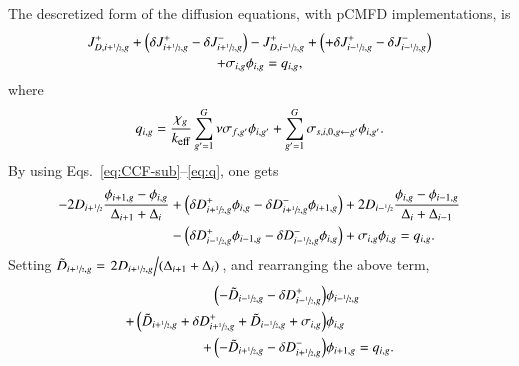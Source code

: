 The descretized form of the diffusion equations, with pCMFD implementations, is
\begin{equation}
  \label{eq:pCMFD-diff1}
  \begin{gathered}
  J_{D,i+\sfrac{1}{2},g}^+ +\left( \delta J_{i+\sfrac{1}{2},g}^+ - \delta J_{i+\sfrac{1}{2},g}^- \right) - J_{D,i-\sfrac{1}{2},g}^+
  + \left( + \delta J_{i-\sfrac{1}{2},g}^+ - \delta J_{i-\sfrac{1}{2},g}^- \right) \\ + \sigma_{i,g}\phi_{i,g} = q_{i,g},
  \end{gathered}
\end{equation}
where
\begin{equation}
  \label{eq:q}
  q_{i,g} = \frac{\chi_g}{\keff}\sum\limits^G_{g'=1}\nu\sigma_{f,g'}\phi_{i,g'} + \sum\limits_{g'=1}^G \sigma_{s,i,0,g\leftarrow g'}\phi_{i,g'}.
\end{equation}
By using Eqs.~\eqref{eq:CCF-sub}--\eqref{eq:q}, one gets
\begin{equation}
  \label{eq:pCMFD-diff2}
  \begin{split}
  -2D_{i+\sfrac{1}{2}}\frac{\phi_{i+1,g} - \phi_{i,g}}{\Delta_{i+1}+\Delta_{i}} &+\left( \delta D^+_{i+\sfrac{1}{2},g}\phi_{i,g}  - \delta D^-_{i+\sfrac{1}{2},g }\phi_{i+1,g}\right)
  +2D_{i-\sfrac{1}{2}}\frac{\phi_{i,g} - \phi_{i-1,g}}{\Delta_{i}+\Delta_{i-1}} \\ 
  &- \left( \delta D^+_{i-\sfrac{1}{2},g}\phi_{i-1,g} -\delta D^-_{i-\sfrac{1}{2},g}\phi_{i,g}\right) +\sigma_{i,g}\phi_{i,g} = q_{i,g}.
  \end{split}
\end{equation}
Setting $\tilde{D}_{i+\sfrac{1}{2},g} = \left. 2D_{i+\sfrac{1}{2},g} \middle/ (\Delta_{i+1}+\Delta_{i})\right.$, and rearranging the above term, 
\begin{equation}
  \label{eq:pCMFD-rearrange}
  \begin{split}
  \left(-\tilde{D}_{i-\sfrac{1}{2},g}-\delta D^+_{i-\sfrac{1}{2},g}\right)&\phi_{i-\sfrac{1}{2},g} \\
  + \left( \tilde{D}_{i+\sfrac{1}{2},g} + \delta D^+_{i+\sfrac{1}{2},g}+ \tilde{D}_{i-\sfrac{1}{2},g} + \sigma_{i,g}\right)&\phi_{i,g} \\
  + \left( -\tilde{D}_{i+\sfrac{1}{2},g} - \delta D^-_{i+\sfrac{1}{2},g}\right)&\phi_{i+1,g} = q_{i,g}.
  \end{split}
\end{equation}

